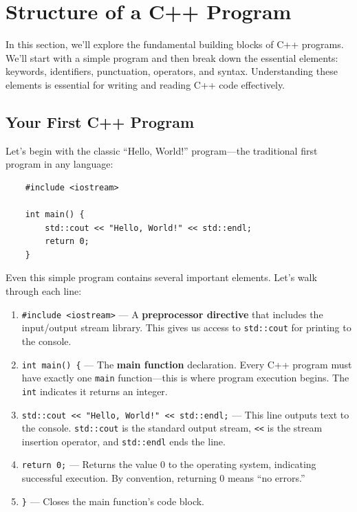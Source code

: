\section{Structure of a C++ Program}

In this section, we'll explore the fundamental building blocks of C++ programs. We'll start with a simple program and then break down the essential elements: keywords, identifiers, punctuation, operators, and syntax. Understanding these elements is essential for writing and reading C++ code effectively.

\subsection{Your First C++ Program}

Let's begin with the classic ``Hello, World!'' program---the traditional first program in any language:

\begin{lstlisting}
	#include <iostream>
	
	int main() {
		std::cout << "Hello, World!" << std::endl;
		return 0;
	}
\end{lstlisting}

Even this simple program contains several important elements. Let's walk through each line:

\begin{enumerate}
	\item \texttt{\#include <iostream>} — A \textbf{preprocessor directive} that includes the input/output stream library. This gives us access to \texttt{std::cout} for printing to the console.
	
	\item \texttt{int main() \{} — The \textbf{main function} declaration. Every C++ program must have exactly one \texttt{main} function—this is where program execution begins. The \texttt{int} indicates it returns an integer.
	
	\item \texttt{std::cout << "Hello, World!" << std::endl;} — This line outputs text to the console. \texttt{std::cout} is the standard output stream, \texttt{<<} is the stream insertion operator, and \texttt{std::endl} ends the line.
	
	\item \texttt{return 0;} --- Returns the value 0 to the operating system, indicating successful execution. By convention, returning 0 means ``no errors.''
	
	\item \texttt{\}} — Closes the main function's code block.
\end{enumerate}

